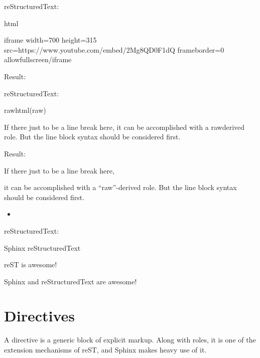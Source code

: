 \documentclass[letterpaper,12pt,english]{sphinxmanual}
\begin{document}
reStructuredText:

\begin{sphinxVerbatim}[commandchars=\\\{\}]
  html

    \PYGZlt{}iframe width=\PYGZdq{}700\PYGZdq{} height=\PYGZdq{}315\PYGZdq{}
    src=\PYGZdq{}https://www.youtube.com/embed/2Mg8QD0F1dQ\PYGZdq{}
    frameborder=\PYGZdq{}0\PYGZdq{} allowfullscreen\PYGZgt{}\PYGZlt{}/iframe\PYGZgt{}
\end{sphinxVerbatim}

Result:



reStructuredText:

\begin{sphinxVerbatim}[commandchars=\\\{\}]
  raw\PYGZhy{}html(raw)
    

If there just  to be a line break here,
it can be accomplished with a \PYGZdq{}raw\PYGZdq{}\PYGZhy{}derived role.
But the line block syntax should be considered first.
\end{sphinxVerbatim}

Result:

If there just  to be a line break here,

it can be accomplished with a “raw”-derived role.
But the line block syntax should be considered first.
\begin{itemize}
\item {} 

\end{itemize}

reStructuredText:

\begin{sphinxVerbatim}[commandchars=\\\{\}]
   Sphinx
   reStructuredText

\textbar{}reST\textbar{} is awesome!
\end{sphinxVerbatim}

Sphinx and reStructuredText are awesome!


\section{Directives}
\label{\detokenize{rtxt:directives}}
A directive is a generic block of explicit markup. Along with roles, it is one of the extension mechanisms of reST, and Sphinx makes heavy use of it.
\end{document}
